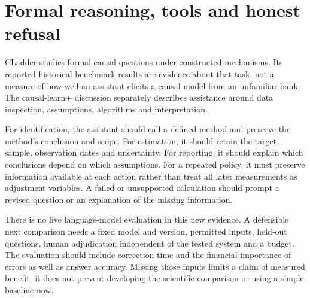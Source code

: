\section{Formal reasoning, tools and honest refusal}
CLadder studies formal causal questions under constructed mechanisms. Its
reported historical benchmark results are evidence about that task, not a
measure of how well an assistant elicits a causal model from an unfamiliar
bank. The causal-learn+ discussion separately describes assistance around data
inspection, assumptions, algorithms and interpretation.
\citep{v12_la_2312_04350,v12_la_2606_23608}

For identification, the assistant should call a defined method and preserve
the method's conclusion and scope. For estimation, it should retain the target,
sample, observation dates and uncertainty. For reporting, it should explain
which conclusions depend on which assumptions. For a repeated policy, it must
preserve information available at each action rather than treat all later
measurements as adjustment variables. A failed or unsupported calculation
should prompt a revised question or an explanation of the missing information.

There is no live language-model evaluation in this new evidence. A defensible
next comparison needs a fixed model and version, permitted inputs, held-out
questions, human adjudication independent of the tested system and a budget.
The evaluation should include correction time and the financial importance of
errors as well as answer accuracy. Missing those inputs limits a claim of
measured benefit; it does not prevent developing the scientific comparison or
using a simple baseline now.

